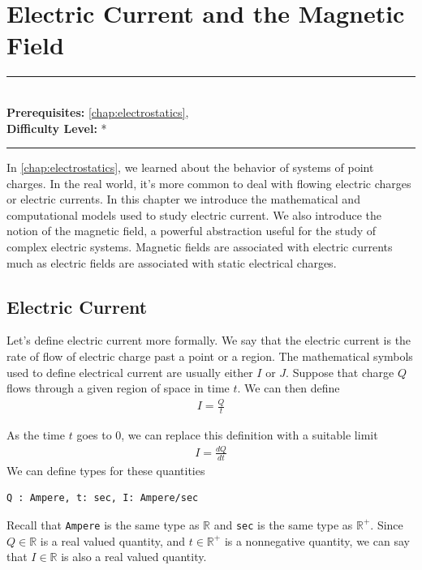 \documentclass[book.tex]{subfiles}
\begin{document}
\chapter{Electric Current and the Magnetic Field}
\label{chap:electric_current}
\noindent\rule{11cm}{0.4pt} \\
\textbf{Prerequisites:} \autoref{chap:electrostatics},  \\
\textbf{Difficulty Level:} * \\
\noindent\rule{11cm}{0.4pt}
\vspace{5mm}


In \autoref{chap:electrostatics}, we learned about the behavior of systems of point charges. In the real world, it's more common to deal with flowing electric charges or electric currents. In this chapter we introduce the mathematical and computational models used to study electric current. We also introduce the notion of the magnetic field, a powerful abstraction useful for the study of complex electric systems. Magnetic fields are associated with electric currents much as electric fields are associated with static electrical charges.

\section{Electric Current}

Let's define electric current more formally. We say that the electric current is the rate of flow of electric charge past a point or a region. The mathematical symbols used to define electrical current are usually either $I$ or $J$. Suppose that charge $Q$ flows through a given region of space in time $t$. We can then define
\begin{align}
    I = \frac{Q}{t}
\end{align}

As the time $t$ goes to $0$, we can replace this definition with a suitable limit
\begin{align}
    I = \frac{dQ}{dt}
\end{align}
We can define types for these quantities
\begin{lstlisting}
Q : Ampere, t: sec, I: Ampere/sec
\end{lstlisting}
Recall that \lstinline{Ampere} is the same type as $\mathbb{R}$ and \lstinline{sec} is the same type as $\mathbb{R}^+$. Since $Q \in \mathbb{R}$ is a real valued quantity, and $t \in \mathbb{R}^+$ is a nonnegative quantity, we can say that $I \in \mathbb{R}$ is also a real valued quantity.
\end{document}
